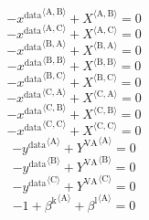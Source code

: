 \begin{equation}
-{x^{\mathrm{data}}}^{\langle \mathrm{\mathrm{A}},\mathrm{\mathrm{B}}\rangle} + {X}^{\langle \mathrm{A},\mathrm{B}\rangle} = 0
\end{equation}
\begin{equation}
-{x^{\mathrm{data}}}^{\langle \mathrm{\mathrm{A}},\mathrm{\mathrm{C}}\rangle} + {X}^{\langle \mathrm{A},\mathrm{C}\rangle} = 0
\end{equation}
\begin{equation}
-{x^{\mathrm{data}}}^{\langle \mathrm{\mathrm{B}},\mathrm{\mathrm{A}}\rangle} + {X}^{\langle \mathrm{B},\mathrm{A}\rangle} = 0
\end{equation}
\begin{equation}
-{x^{\mathrm{data}}}^{\langle \mathrm{\mathrm{B}},\mathrm{\mathrm{B}}\rangle} + {X}^{\langle \mathrm{B},\mathrm{B}\rangle} = 0
\end{equation}
\begin{equation}
-{x^{\mathrm{data}}}^{\langle \mathrm{\mathrm{B}},\mathrm{\mathrm{C}}\rangle} + {X}^{\langle \mathrm{B},\mathrm{C}\rangle} = 0
\end{equation}
\begin{equation}
-{x^{\mathrm{data}}}^{\langle \mathrm{\mathrm{C}},\mathrm{\mathrm{A}}\rangle} + {X}^{\langle \mathrm{C},\mathrm{A}\rangle} = 0
\end{equation}
\begin{equation}
-{x^{\mathrm{data}}}^{\langle \mathrm{\mathrm{C}},\mathrm{\mathrm{B}}\rangle} + {X}^{\langle \mathrm{C},\mathrm{B}\rangle} = 0
\end{equation}
\begin{equation}
-{x^{\mathrm{data}}}^{\langle \mathrm{\mathrm{C}},\mathrm{\mathrm{C}}\rangle} + {X}^{\langle \mathrm{C},\mathrm{C}\rangle} = 0
\end{equation}
\begin{equation}
-{y^{\mathrm{data}}}^{\langle \mathrm{\mathrm{A}}\rangle} + {Y^{\mathrm{VA}}}^{\langle \mathrm{A}\rangle} = 0
\end{equation}
\begin{equation}
-{y^{\mathrm{data}}}^{\langle \mathrm{\mathrm{B}}\rangle} + {Y^{\mathrm{VA}}}^{\langle \mathrm{B}\rangle} = 0
\end{equation}
\begin{equation}
-{y^{\mathrm{data}}}^{\langle \mathrm{\mathrm{C}}\rangle} + {Y^{\mathrm{VA}}}^{\langle \mathrm{C}\rangle} = 0
\end{equation}
\begin{equation}
-1 + {\beta^{\mathrm{k}}}^{\langle \mathrm{\mathrm{A}}\rangle} + {\beta^{\mathrm{l}}}^{\langle \mathrm{\mathrm{A}}\rangle} = 0
\end{equation}
